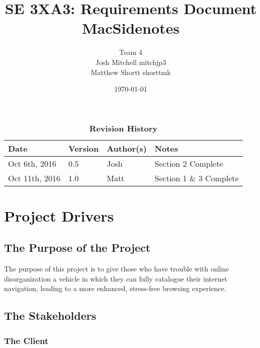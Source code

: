 \documentclass[12pt, titlepage]{article}
\title{SE 3XA3: Requirements Document\\MacSidenotes}
\author{Team 4
		\\ Josh Mitchell mitchjp3
		\\ Matthew Shortt shorttmk
}
\date{\today}
\begin{document}
\maketitle

\tableofcontents
\listoftables
\listoffigures



\begin{table}[h]
\caption{\bf Revision History}
\begin{tabularx}{\textwidth}{p{3cm}p{2cm}p{2cm}X}
\toprule {\bf Date} & {\bf Version} & {\bf Author(s)} & {\bf Notes}\\
\midrule
Oct 6th, 2016 & 0.5 & Josh & Section 2 Complete\\
Oct 11th, 2016 & 1.0 & Matt & Section 1 \& 3 Complete\\
\bottomrule
\end{tabularx}
\end{table}

\newpage




\section{Project Drivers}

\subsection{The Purpose of the Project}

The purpose of this project is to give those who have trouble with online disorganization 
a vehicle in which they can fully catalogue their internet navigation, leading to a more 
enhanced, stress-free browsing experience. 

\subsection{The Stakeholders}

\subsubsection{The Client}
\end{document}
